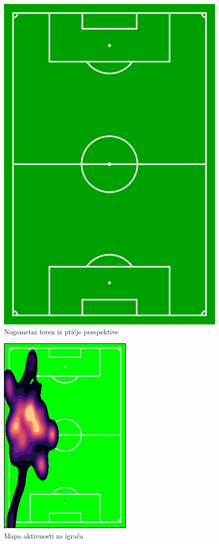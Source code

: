 \documentclass[times, utf8, seminar, numeric]{fer}
\begin{document}
\begin{figure}
	\centering
	\includegraphics[scale=0.15]{slike/pitch.png}
	\caption {Nogometni teren iz ptičje perspektive}
	\label{fig:pitch}	
\end{figure}

\begin{figure}
	\centering
	\includegraphics[scale=0.75]{slike/heatmap.png}
	\caption {Mapa aktivnosti za igrača}
	\label{fig:heatmap}	
\end{figure}
\end{document}
